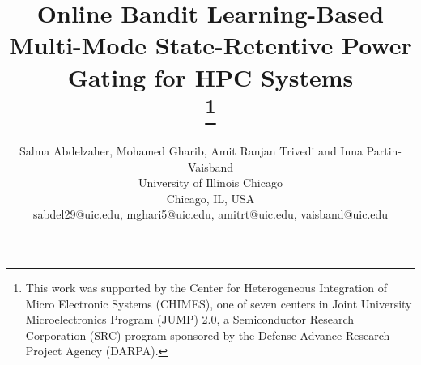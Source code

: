 \documentclass[conference]{IEEEtran}
\begin{document}
\title{Online Bandit Learning-Based Multi-Mode State-Retentive Power Gating for HPC Systems\\
\thanks{This work was supported by the Center for Heterogeneous Integration of Micro Electronic Systems (CHIMES), one of seven centers in Joint University Microelectronics Program (JUMP) 2.0, a Semiconductor Research Corporation (SRC) program sponsored by the Defense Advance Research Project Agency (DARPA).}
}

\author{
\begin{minipage}[t]{\linewidth}
    \centering
    Salma Abdelzaher, Mohamed Gharib, Amit Ranjan Trivedi and Inna Partin-Vaisband\\
    University of Illinois Chicago\\
    Chicago, IL, USA \\
    sabdel29@uic.edu, mghari5@uic.edu, amitrt@uic.edu, vaisband@uic.edu
\end{minipage}
\hfill
}


\maketitle
\end{document}
